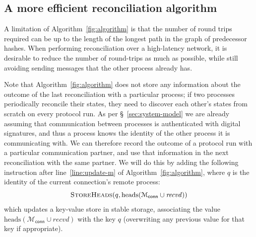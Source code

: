 \documentclass[a4paper,anonymous,USenglish]{lipics-v2019}
\begin{document}
\subsection{A more efficient reconciliation algorithm}\label{sec:algorithm2}

A limitation of Algorithm~\ref{fig:algorithm} is that the number of round trips required can be up to the length of the longest path in the graph of predecessor hashes.
When performing reconciliation over a high-latency network, it is desirable to reduce the number of round-trips as much as possible, while still avoiding sending messages that the other process already has.

Note that Algorithm~\ref{fig:algorithm} does not store any information about the outcome of the last reconciliation with a particular process; if two processes periodically reconcile their states, they need to discover each other's states from scratch on every protocol run.
As per \S~\ref{sec:system-model} we are already assuming that communication between processes is authenticated with digital signatures, and thus a process knows the identity of the other process it is communicating with.
We can therefore record the outcome of a protocol run with a particular communication partner, and use that information in the next reconciliation with the same partner.
We will do this by adding the following instruction after line~\ref{line:update-m} of Algorithm~\ref{fig:algorithm}, where $q$ is the identity of the current connection's remote process:
\[ \textsc{StoreHeads}(q, \mathrm{heads}(\mathcal{M}_\mathsf{conn} \cup \mathit{recvd})) \]
which updates a key-value store in stable storage, associating the value $\mathrm{heads}(\mathcal{M}_\mathsf{conn} \cup \mathit{recvd})$ with the key $q$ (overwriting any previous value for that key if appropriate).
\end{document}
